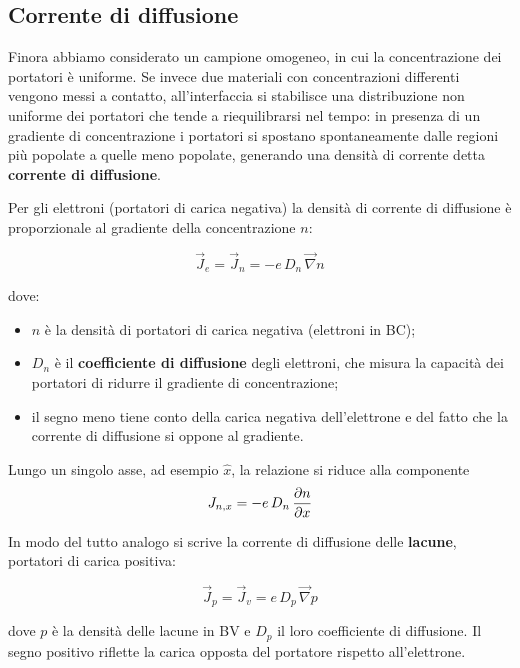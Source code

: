 \subsection{Corrente di diffusione}


Finora abbiamo considerato un campione omogeneo, in cui la concentrazione dei portatori è uniforme. Se invece due materiali con concentrazioni differenti vengono messi a contatto, all'interfaccia si stabilisce una distribuzione non uniforme dei portatori che tende a riequilibrarsi nel tempo: in presenza di un gradiente di concentrazione i portatori si spostano spontaneamente dalle regioni più popolate a quelle meno popolate, generando una densità di corrente detta \textbf{corrente di diffusione}.

Per gli elettroni (portatori di carica negativa) la densità di corrente di diffusione è proporzionale al gradiente della concentrazione \( n \):
\begin{importantbox}
    \begin{equation}
        \vec{J}_e = \vec{J}_n = -e \, D_n \, \vec{\nabla} n
    \end{equation}
\end{importantbox}
dove:
\begin{itemize}
    \item \( n \) è la densità di portatori di carica negativa (elettroni in BC);
    \item \( D_n \) è il \textbf{coefficiente di diffusione} degli elettroni, che misura la capacità dei portatori di ridurre il gradiente di concentrazione;
    \item il segno meno tiene conto della carica negativa dell'elettrone e del fatto che la corrente di diffusione si oppone al gradiente.
\end{itemize}
Lungo un singolo asse, ad esempio \( \hat{x} \), la relazione si riduce alla componente
\begin{equation}
    J_{n, x} = -e \, D_n \, \pdv{n}{x}
\end{equation}

In modo del tutto analogo si scrive la corrente di diffusione delle \textbf{lacune}, portatori di carica positiva:
\begin{importantbox}
    \begin{equation}
        \vec{J}_p = \vec{J}_v = e \, D_p \, \vec{\nabla} p
    \end{equation}
\end{importantbox}
dove \( p \) è la densità delle lacune in BV e \( D_p \) il loro coefficiente di diffusione. Il segno positivo riflette la carica opposta del portatore rispetto all'elettrone.

